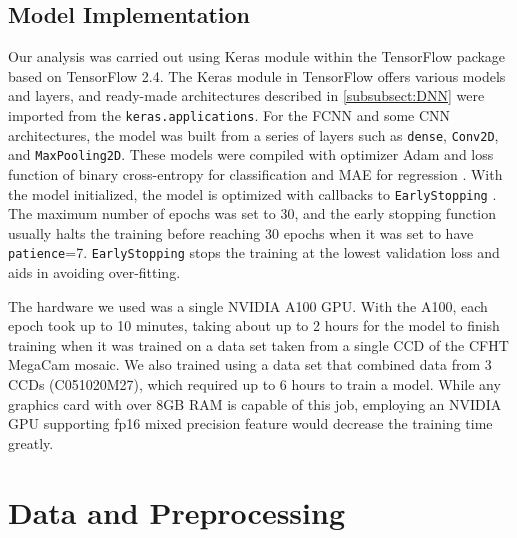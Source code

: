 \subsection{Model Implementation}
Our analysis was carried out using Keras module within the TensorFlow package based on TensorFlow 2.4. 
The Keras module in TensorFlow offers various models and layers, and ready-made architectures described in \ref{subsubsect:DNN} were imported from the \texttt{keras.applications}.
For the FCNN and some CNN architectures, the model was built from a series of layers such as \texttt{dense}, \texttt{Conv2D}, and \texttt{MaxPooling2D}.
These models were compiled with optimizer Adam and loss function of binary cross-entropy for classification and MAE for regression \citep{kingma2017adam}.
With the model initialized, the model is optimized with callbacks to \texttt{EarlyStopping} \citep{Zhang2017UnderstandingDL}.
The maximum number of epochs was set to 30, and the early stopping function usually halts the training before reaching 30 epochs when it was set to have \texttt{patience}=7. 
\texttt{EarlyStopping} stops the training at the lowest validation loss and aids in avoiding over-fitting.

The hardware we used was a single NVIDIA A100 GPU.
With the A100, each epoch took up to 10 minutes, taking about up to 2 hours for the model to finish training when it was trained on a data set taken from a single CCD of the CFHT MegaCam mosaic. 
We also trained using a data set that combined data from 3 CCDs (C051020M27), which required up to 6 hours to train a model.
While any graphics card with over 8GB RAM is capable of this job, employing an NVIDIA GPU supporting fp16 mixed precision feature would decrease the training time greatly.

\section{Data and Preprocessing}
\label{sect: Data}

